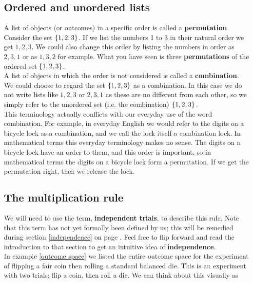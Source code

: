 \subsection{Ordered and unordered lists}
A list of objects (or outcomes) in a specific order is called a \textbf{permutation}. Consider the set $\left\{1,2,3\right\}$. If we list the numbers 1 to 3 in their natural order we get $1,2,3.$ We could also change this order by listing the numbers in order as $2,3,1$ or as $1,3,2$ for example.  What you have seen is three \textbf{permutations} of the ordered set $\left\{1,2,3\right\}$. \label{combination} \label{permutation} \\

\noindent A list of objects in which the order is not considered is called a \textbf{combination}. We could choose to regard the set $\left\{1,2,3\right\}$ as a combination. In this case we do not write lists like $1,2,3$ or $2,3,1$ as these are no different from each other, so we simply refer to the unordered set (i.e. the combination) $\left\{1,2,3\right\}.$ \\

\noindent This terminology actually conflicts with our everyday use of the word combination. For example, in everyday English we would refer to the digits on a bicycle lock as a combination, and we call the lock itself a combination lock. In mathematical terms this everyday terminology makes no sense. The digits on a bicycle lock have an order to them, and this order is important, so in mathematical terms the digits on a bicycle lock form a permutation. If we get the permutation right, then we release the lock.

\subsection{The multiplication rule} \label{secmult}
We will need to use the term, \textbf{independent trials}, to describe this rule. Note that this term has not yet formally been defined by us; this will be remedied during section \ref{independence} on page \pageref{independence}. Feel free to flip forward and read the introduction to that section to get an intuitive idea of \textbf{independence}. \\

 
\noindent In example \ref{outcome space} we listed the entire outcome space for the experiment of flipping a fair coin then rolling a standard balanced die. This is an experiment with two trials: flip a coin, then roll a die. We can think about this visually as

